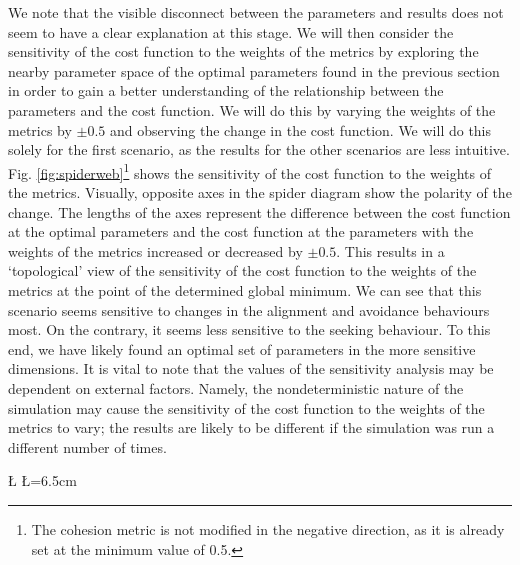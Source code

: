 \documentclass[12pt]{article}
\begin{document}
We note that the visible disconnect between the parameters and results does not seem to have a clear explanation at this stage. We will then consider the sensitivity of the cost function to the weights of the metrics by exploring the nearby parameter space of the optimal parameters found in the previous section in order to gain a better understanding of the relationship between the parameters and the cost function. We will do this by varying the weights of the metrics by $\pm 0.5$ and observing the change in the cost function. We will do this solely for the first scenario, as the results for the other scenarios are less intuitive. Fig. \ref{fig:spiderweb}\footnote{The cohesion metric is not modified in the negative direction, as it is already set at the minimum value of 0.5.} shows the sensitivity of the cost function to the weights of the metrics. Visually, opposite axes in the spider diagram show the polarity of the change. The lengths of the axes represent the difference between the cost function at the optimal parameters and the cost function at the parameters with the weights of the metrics increased or decreased by $\pm 0.5$. This results in a `topological' view of the sensitivity of the cost function to the weights of the metrics at the point of the determined global minimum. We can see that this scenario seems sensitive to changes in the alignment and avoidance behaviours most. On the contrary, it seems less sensitive to the seeking behaviour. To this end, we have likely found an optimal set of parameters in the more sensitive dimensions. It is vital to note that the values of the sensitivity analysis may be dependent on external factors. Namely, the nondeterministic nature of the simulation may cause the sensitivity of the cost function to the weights of the metrics to vary; the results are likely to be different if the simulation was run a different number of times.

\newcommand{\D}{10} %
\newcommand{\U}{13} %

\newdimen\R %
\R=6cm 
\newdimen\L %
\L=6.5cm

\newcommand{\A}{360/\D} %
\end{document}

